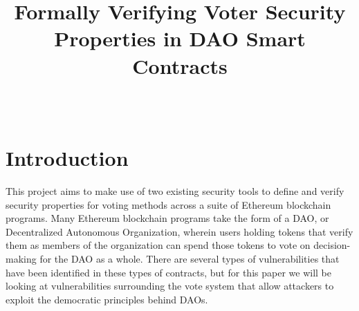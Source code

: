 \documentclass[conference]{IEEEtran}
\begin{document}
\title{Formally Verifying Voter Security Properties in DAO Smart Contracts}

\author{
    \\[1.5em]

}

\maketitle






\section{Introduction}
This project aims to make use of two existing security tools to define and verify security properties for voting methods across a suite of Ethereum blockchain programs. Many Ethereum blockchain programs take the form of a DAO, or Decentralized Autonomous Organization, wherein users holding tokens that verify them as members of the organization can spend those tokens to vote on decision-making for the DAO as a whole. There are several types of vulnerabilities that have been identified in these types of contracts, but for this paper we will be looking at vulnerabilities surrounding the vote system that allow attackers to exploit the democratic principles behind DAOs.
\end{document}
